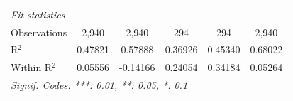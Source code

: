 \begin{table}[htbp]
\begin{tabular}{lccccc}
      \midrule
      \emph{Fit statistics}\\
      Observations                               & 2,940         & 2,940        & 294            & 294            & 2,940\\  
      R$^2$                                      & 0.47821       & 0.57888      & 0.36926        & 0.45340        & 0.68022\\  
      Within R$^2$                               & 0.05556       & -0.14166     & 0.24054        & 0.34184        & 0.05264\\  
      \midrule \midrule
      \multicolumn{6}{l}{\emph{Signif. Codes: ***: 0.01, **: 0.05, *: 0.1}}\\
   \end{tabular}
\end{table}


